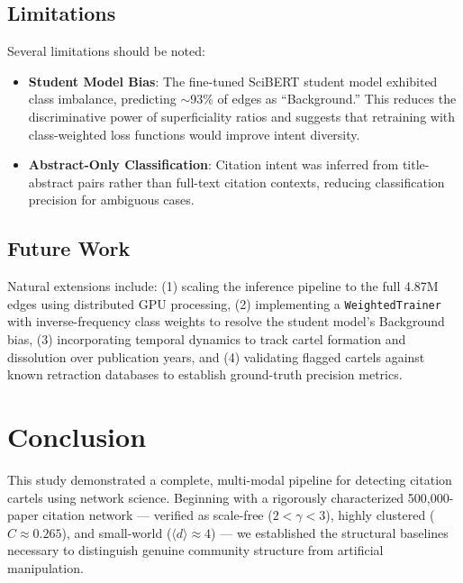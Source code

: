 \subsection{Limitations}
Several limitations should be noted:
\begin{itemize}
    \item \textbf{Student Model Bias}: The fine-tuned SciBERT student model exhibited class imbalance, predicting $\sim$93\% of edges as ``Background.'' This reduces the discriminative power of superficiality ratios and suggests that retraining with class-weighted loss functions would improve intent diversity.
    \item \textbf{Abstract-Only Classification}: Citation intent was inferred from title-abstract pairs rather than full-text citation contexts, reducing classification precision for ambiguous cases.
\end{itemize}

\subsection{Future Work}
Natural extensions include: (1) scaling the inference pipeline to the full 4.87M edges using distributed GPU processing, (2) implementing a \texttt{WeightedTrainer} with inverse-frequency class weights to resolve the student model's Background bias, (3) incorporating temporal dynamics to track cartel formation and dissolution over publication years, and (4) validating flagged cartels against known retraction databases to establish ground-truth precision metrics.


\section{Conclusion}
This study demonstrated a complete, multi-modal pipeline for detecting citation cartels using network science. Beginning with a rigorously characterized 500,000-paper citation network --- verified as scale-free ($2 < \gamma < 3$), highly clustered ($C \approx 0.265$), and small-world ($\langle d \rangle \approx 4$) --- we established the structural baselines necessary to distinguish genuine community structure from artificial manipulation.

